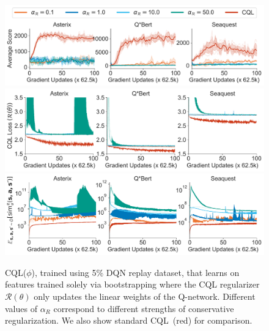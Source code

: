 
\begin{figure}
    \centering
    \includegraphics[width=\linewidth]{atari/cql_on_bootstrapping_feat.pdf}
    \includegraphics[width=\linewidth]{atari/cql_losses_bootstrapped_feat.pdf}
    \includegraphics[width=\linewidth]{atari/sim_s_ns_cql_on_bootstrapping_feat.pdf}
    \vspace{-0.65cm}
    \caption{\small{CQL($\phi$), trained using 5\% DQN replay dataset, that learns on features trained solely via bootstrapping where the CQL regularizer $\mathcal{R}(\theta)$ only updates the linear weights of the Q-network. Different values of $\alpha_R$ correspond to different strengths of conservative regularization. We also show standard CQL~(red) for comparison.}} 
    \label{fig:atari_3_games_cql_bootstrap}
    \vspace{-0.6cm}
\end{figure}
